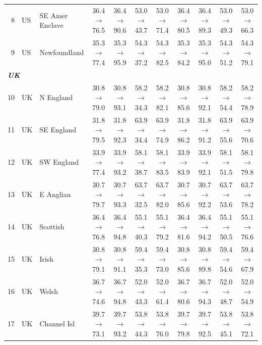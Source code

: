 \begin{table}[t]
{\begin{tabular}{rll c c c c c c c c}
8 & US & SE Amer Enclave & 36.4$\rightarrow$76.5 & 36.4$\rightarrow$90.6 & 53.0$\rightarrow$43.7 & 53.0$\rightarrow$71.4 & 36.4$\rightarrow$80.5 & 36.4$\rightarrow$89.3 & 53.0$\rightarrow$49.3 & 53.0$\rightarrow$66.3 \\
9 & US & Newfoundland & 35.3$\rightarrow$77.4 & 35.3$\rightarrow$95.9 & 54.3$\rightarrow$37.2 & 54.3$\rightarrow$82.5 & 35.3$\rightarrow$84.2 & 35.3$\rightarrow$95.0 & 54.3$\rightarrow$51.2 & 54.3$\rightarrow$79.1 \\
\midrule
\multicolumn{11}{l}{\textit{\textbf{UK}}} \\
10 & UK & N England & 30.8$\rightarrow$79.0 & 30.8$\rightarrow$93.1 & 58.2$\rightarrow$34.3 & 58.2$\rightarrow$82.1 & 30.8$\rightarrow$85.6 & 30.8$\rightarrow$92.1 & 58.2$\rightarrow$54.4 & 58.2$\rightarrow$78.9 \\
11 & UK & SE England & 31.8$\rightarrow$79.5 & 31.8$\rightarrow$92.3 & 63.9$\rightarrow$34.4 & 63.9$\rightarrow$74.9 & 31.8$\rightarrow$86.2 & 31.8$\rightarrow$91.2 & 63.9$\rightarrow$55.6 & 63.9$\rightarrow$70.6 \\
12 & UK & SW England & 33.9$\rightarrow$77.4 & 33.9$\rightarrow$93.2 & 58.1$\rightarrow$38.7 & 58.1$\rightarrow$83.5 & 33.9$\rightarrow$83.9 & 33.9$\rightarrow$92.1 & 58.1$\rightarrow$51.5 & 58.1$\rightarrow$79.8 \\
13 & UK & E Anglian & 30.7$\rightarrow$79.7 & 30.7$\rightarrow$93.3 & 63.7$\rightarrow$32.5 & 63.7$\rightarrow$82.0 & 30.7$\rightarrow$85.6 & 30.7$\rightarrow$92.2 & 63.7$\rightarrow$53.6 & 63.7$\rightarrow$78.2 \\
14 & UK & Scottish & 36.4$\rightarrow$76.8 & 36.4$\rightarrow$94.8 & 55.1$\rightarrow$40.3 & 55.1$\rightarrow$79.2 & 36.4$\rightarrow$81.6 & 36.4$\rightarrow$94.2 & 55.1$\rightarrow$50.5 & 55.1$\rightarrow$76.6 \\
15 & UK & Irish & 30.8$\rightarrow$79.1 & 30.8$\rightarrow$91.1 & 59.4$\rightarrow$35.3 & 59.4$\rightarrow$73.0 & 30.8$\rightarrow$85.6 & 30.8$\rightarrow$89.8 & 59.4$\rightarrow$54.6 & 59.4$\rightarrow$67.9 \\
16 & UK & Welsh & 36.7$\rightarrow$74.6 & 36.7$\rightarrow$94.8 & 52.0$\rightarrow$43.3 & 52.0$\rightarrow$61.4 & 36.7$\rightarrow$80.6 & 36.7$\rightarrow$94.3 & 52.0$\rightarrow$48.7 & 52.0$\rightarrow$54.9 \\
17 & UK & Channel Isl & 39.7$\rightarrow$73.1 & 39.7$\rightarrow$93.2 & 53.8$\rightarrow$44.3 & 53.8$\rightarrow$76.0 & 39.7$\rightarrow$79.8 & 39.7$\rightarrow$92.5 & 53.8$\rightarrow$45.1 & 53.8$\rightarrow$72.1 \\

\end{tabular}}
\end{table}
